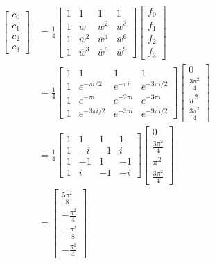 \documentclass[a4paper]{article}
\begin{document}
\begin{enumerate}
\begin{enumerate}
	 \begin{align*}
	 \begin{bmatrix}
	 c_0 \\ c_1 \\ c_2 \\ c_3
	 \end{bmatrix}
	 &= \frac{1}{4}
	 \begin{bmatrix}
	 1 & 1 & 1 & 1\\
	 1 & \overline{w} & \overline{w}^2 & \overline{w}^3 \\
	 1 & \overline{w}^2 & \overline{w}^4 & \overline{w}^6 \\
	 1 & \overline{w}^3 & \overline{w}^6 & \overline{w}^9
	 \end{bmatrix}
	 \begin{bmatrix}
	 f_0 \\ f_1 \\ f_2 \\ f_3
	 \end{bmatrix} \\
	 &= \frac{1}{4}
	 \begin{bmatrix}
	 1 & 1 & 1 & 1\\
	 1 & e^{-\pi i / 2} & e^{-\pi i} & e^{-3\pi i / 2} \\
	 1 & e^{-\pi i} & e^{-2\pi i} & e^{-3\pi i} \\
	 1 & e^{-3\pi i / 2} & e^{-3\pi i} & e^{- 9\pi i / 2}
	 \end{bmatrix}
	 \begin{bmatrix}
	 0 \\ \frac{3\pi^2}{4} \\ \pi^2 \\ \frac{3\pi^2}{4}
	 \end{bmatrix} \\
	 &= \frac{1}{4}
	 \begin{bmatrix}
	 1 & 1 & 1 & 1\\
	 1 & -i & -1 & i\\
	 1 & -1 & 1 & -1 \\
	 1 & i & -1 & -i
	 \end{bmatrix}
	  \begin{bmatrix}
	 0 \\ \frac{3\pi^2}{4} \\ \pi^2 \\ \frac{3\pi^2}{4}
	 \end{bmatrix} \\
	 &= 
	 \begin{bmatrix}
	 \frac{5\pi^2}{8}\\ -\frac{\pi^2}{4} \\ -\frac{\pi^2}{8} \\
	 -\frac{\pi^2}{4}
	 \end{bmatrix} \\
	 \end{align*}
	 

\end{enumerate}
\end{enumerate}
\end{document}
